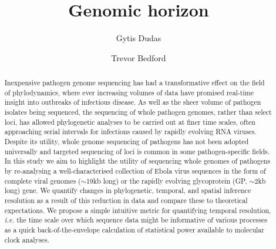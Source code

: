 \documentclass[11pt,oneside,letterpaper]{article}
\title{\vspace{1.0cm} \LARGE \bf Genomic horizon}
\author[1,2$\ast$]{Gytis Dudas}
\author[1]{Trevor Bedford}
\affil[1]{Vaccine and Infectious Disease Division, Fred Hutchinson Cancer Research Center, Seattle, WA, USA}
\affil[2]{Gothenburg Global Biodiversity Center, Gothenburg, Sweden}
\def\tbc#1{\textcolor{purple}{[#1]}}
\begin{document}
\maketitle

\begin{abstract}
Inexpensive pathogen genome sequencing has had a transformative effect on the field of phylodynamics, where ever increasing volumes of data have promised real-time insight into outbreaks of infectious disease.
As well as the sheer volume of pathogen isolates being sequenced, the sequencing of whole pathogen genomes, rather than select loci, has allowed phylogenetic analyses to be carried out at finer time scales, often approaching serial intervals for infections caused by rapidly evolving RNA viruses.
Despite its utility, whole genome sequencing of pathogens has not been adopted universally and targeted sequencing of loci is common in some pathogen-specific fields.
In this study we aim to highlight the utility of sequencing whole genomes of pathogens by re-analysing a well-characterised collection of Ebola virus sequences in the form of complete viral genomes ($\sim$19kb long) or the rapidly evolving glycoprotein (GP, $\sim$2kb long) gene.
We quantify changes in phylogenetic, temporal, and spatial inference resolution as a result of this reduction in data and compare these to theoretical expectations.
We propose a simple intuitive metric for quantifying temporal resolution, \textit{i.e.} the time scale over which sequence data might be informative of various processes as a quick back-of-the-envelope calculation of statistical power available to molecular clock analyses.

\end{abstract}
\end{document}
